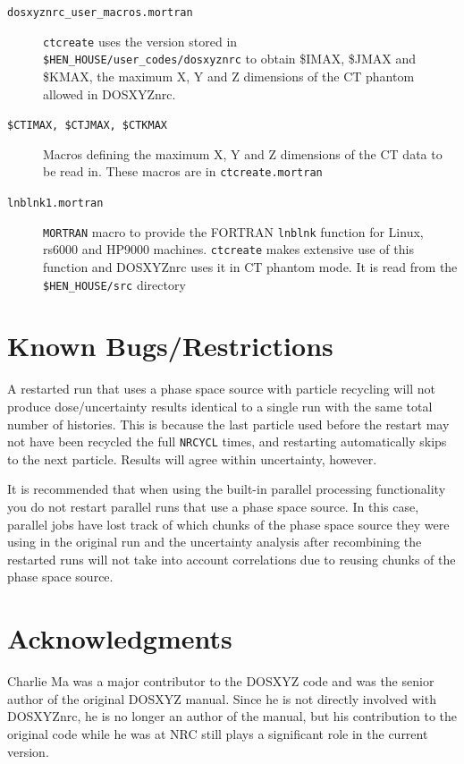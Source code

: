\documentclass[12pt,twoside]{article}      %
\begin{document}
\begin{description}
\item[{\tt dosxyznrc\_user\_macros.mortran}]
{\tt ctcreate} uses the version stored in\\
{\tt \$HEN\_HOUSE/user\_codes/dosxyznrc}
to obtain {\$IMAX}, {\$JMAX} and {\$KMAX},
the maximum X, Y and Z dimensions of the CT phantom allowed in DOSXYZnrc.

\item[{\tt \$CTIMAX, \$CTJMAX, \$CTKMAX }]
Macros defining the maximum X, Y and Z dimensions of the CT data to be read in.
These macros are in {\tt ctcreate.mortran}

\item[{\tt lnblnk1.mortran}] {\tt MORTRAN} macro to provide the
FORTRAN {\tt lnblnk} function for Linux, rs6000 and HP9000 machines.
{\tt ctcreate} makes extensive use of this function and DOSXYZnrc uses it
in CT phantom mode.  It
is read from the {\tt \$HEN\_HOUSE/src} directory
\end{description}

\section{Known Bugs/Restrictions}

A restarted run that uses a phase space source with particle recycling will
not produce dose/uncertainty results identical to a single run with
the same total number of histories.  This is because the last particle
used before the restart may not have been recycled the full
{\tt NRCYCL} times, and restarting automatically skips to the next particle.
Results will agree within uncertainty, however.

It is recommended that when using the built-in parallel processing
functionality you do not restart parallel runs that use
a phase space source.  In this case, parallel jobs have lost track
of which chunks of the phase space source they were using in the
original run and the uncertainty analysis after recombining the
restarted runs will not take into account correlations due to reusing
chunks of the phase space source.

\section{Acknowledgments}

Charlie Ma was a major contributor to the DOSXYZ code and was the senior
author of the original DOSXYZ manual. Since he is not directly involved
with DOSXYZnrc, he is no longer an author of the manual, but his
contribution to the original code while he was at NRC still plays a
significant role in the current version.
\end{document}
